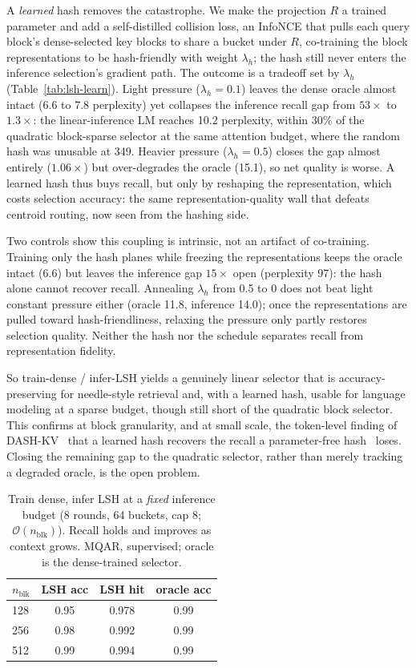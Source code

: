 \documentclass[10pt,letterpaper]{article}
\newcommand{\Ocomplex}{\mathcal{O}}
\begin{document}
A \emph{learned} hash removes the catastrophe. We make the projection $R$ a trained
parameter and add a self-distilled collision loss, an InfoNCE that pulls each query
block's dense-selected key blocks to share a bucket under $R$, co-training the block
representations to be hash-friendly with weight $\lambda_h$; the hash still never
enters the inference selection's gradient path. The outcome is a tradeoff set by
$\lambda_h$ (Table~\ref{tab:lsh-learn}). Light pressure ($\lambda_h{=}0.1$) leaves
the dense oracle almost intact (6.6 to 7.8 perplexity) yet collapses the inference
recall gap from $53\times$ to $1.3\times$: the linear-inference LM reaches 10.2
perplexity, within $30\%$ of the quadratic block-sparse selector at the same
attention budget, where the random hash was unusable at 349. Heavier pressure
($\lambda_h{=}0.5$) closes the gap almost entirely ($1.06\times$) but over-degrades
the oracle (15.1), so net quality is worse. A learned hash thus buys recall, but
only by reshaping the representation, which costs selection accuracy: the same
representation-quality wall that defeats centroid routing, now seen from the
hashing side.

Two controls show this coupling is intrinsic, not an artifact of co-training.
Training only the hash planes while freezing the representations keeps the oracle
intact (6.6) but leaves the inference gap $15\times$ open (perplexity 97): the hash
alone cannot recover recall. Annealing $\lambda_h$ from 0.5 to 0 does not beat light
constant pressure either (oracle 11.8, inference 14.0); once the representations are
pulled toward hash-friendliness, relaxing the pressure only partly restores
selection quality. Neither the hash nor the schedule separates recall from
representation fidelity.

So train-dense / infer-LSH yields a genuinely linear selector that is
accuracy-preserving for needle-style retrieval and, with a learned hash, usable for
language modeling at a sparse budget, though still short of the quadratic block
selector. This confirms at block granularity, and at small scale, the token-level
finding of DASH-KV~\cite{guo2026dashkv} that a learned hash recovers the recall a
parameter-free hash~\cite{rabbani2024lshe} loses. Closing the remaining gap to the
quadratic selector, rather than merely tracking a degraded oracle, is the open
problem.

\begin{table}[h]
\centering
\caption{Train dense, infer LSH at a \emph{fixed} inference budget (8 rounds, 64
buckets, cap 8; $\Ocomplex(n_{\text{blk}})$). Recall holds and improves as context
grows. MQAR, supervised; oracle is the dense-trained selector.}
\label{tab:lsh-scale}
\small
\begin{tabular}{lccc}
\toprule
$n_{\text{blk}}$ & LSH acc & LSH hit & oracle acc \\
\midrule
128 & 0.95 & 0.978 & 0.99 \\
256 & 0.98 & 0.992 & 0.99 \\
512 & 0.99 & 0.994 & 0.99 \\
\bottomrule
\end{tabular}
\end{table}
\end{document}
